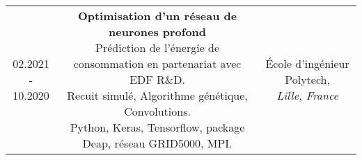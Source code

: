 \documentclass[a4paper]{article}
\begin{document}
\begin{titlepage}
\begin{tabular}{ccc}
\\

\parbox[]{0.08\linewidth}{02.2021 -\\ 10.2020\\} 
&
\parbox[]{0.62\linewidth}{\textbf{\large 
Optimisation d'un r\'{e}seau de neurones profond}\\
Pr\'{e}diction de l'\'{e}nergie de consommation en partenariat avec EDF R\&D.\\
Recuit simul\'{e}, Algorithme g\'{e}n\'{e}tique, Convolutions.\\
Python, Keras, Tensorflow, package Deap, r\'{e}seau GRID5000, MPI.\\}
&
\parbox[]{0.3\linewidth}{\'{E}cole d'ing\'{e}nieur Polytech,\\ \textit{Lille, France}\\}
\end{tabular}

\medskip


\end{titlepage}
\end{document}
